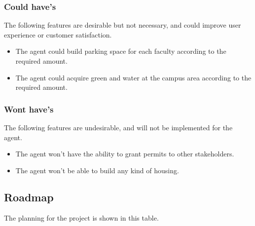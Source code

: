 \subsubsection{Could have's}
The following features are desirable but not necessary, and could improve user experience or customer satisfaction.
\begin{itemize}
	\item The agent could build parking space for each faculty according to the required amount.
	\item The agent could acquire green and water at the campus area according to the required amount.
\end{itemize}

\subsubsection{Wont have's}
The following features are undesirable, and will not be implemented for the
agent.
\begin{itemize}
	\item The agent won’t have the ability to grant permits to other stakeholders.
	\item The agent won’t be able to build any kind of housing.
\end{itemize}

\subsection{Roadmap}
The planning for the project is shown in this table.

